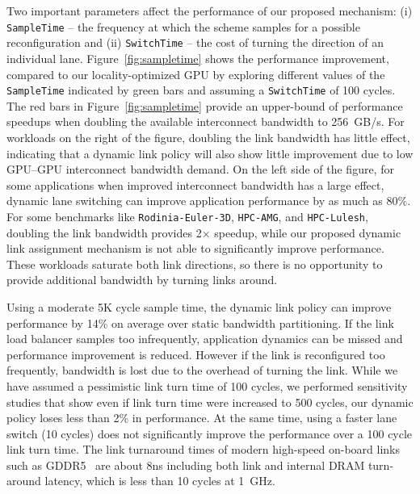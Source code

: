 Two important parameters affect the performance of
our proposed mechanism: (i)
\texttt{SampleTime} -- the frequency at which the scheme samples for a possible
reconfiguration and (ii) \texttt{SwitchTime} -- the cost of turning the
direction of an individual lane. Figure~\ref{fig:sampletime} shows the 
performance improvement, compared to our locality-optimized GPU by exploring different values of the
\texttt{SampleTime} indicated by green bars and assuming a \texttt{SwitchTime}
of 100 cycles. The red bars in Figure~\ref{fig:sampletime} provide an
upper-bound of performance speedups when doubling the available interconnect
bandwidth to \SI{256}{GB/s}. For workloads on the right of the figure, doubling the link
bandwidth has little effect, indicating that a dynamic link policy will also show little
improvement due to low GPU--GPU interconnect bandwidth demand.
On the left side of the figure, for some
applications when improved interconnect bandwidth has a large effect,
dynamic lane switching can improve application performance by as much as 80\%.
For some benchmarks like \texttt{Rodinia-Euler-3D}, \texttt{HPC-AMG}, and 
\texttt{HPC-Lulesh}, doubling the link bandwidth provides 2$\times$ 
speedup, while our proposed dynamic link assignment mechanism is not 
able to significantly improve performance. These workloads 
saturate both link directions, so there is no opportunity to 
provide additional bandwidth by turning links around.

Using a moderate 5K cycle sample time, the dynamic link policy can improve performance
by 14\% on average over static bandwidth partitioning. If the link load
balancer samples too infrequently, application dynamics can be missed
and performance improvement is reduced. However if the link is reconfigured
too frequently, bandwidth is lost due to the overhead of turning the link.
While we have assumed a pessimistic link turn time of 100 cycles, we performed
sensitivity studies that show even if link turn time were increased to 500
cycles, our dynamic policy loses less than 2\% in performance. 
At the same time, using a faster lane switch (10 cycles) does not
significantly improve the performance over a 100 cycle link turn time.
The link
turnaround times of modern high-speed on-board links such as
GDDR5~\cite{hynixgddr51Gb} are about 8ns including both link and internal 
DRAM turn-around latency, which is less than 10 cycles at \SI{1}{GHz}.

